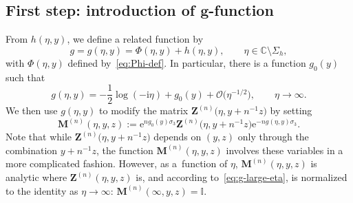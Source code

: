 \documentclass[11pt]{article}
\numberwithin{equation}{section}
\numberwithin{equation}{section}
\begin{document}
\subsection[First step: introduction of g-function]{First step: introduction of $\boldsymbol{g}$-function}
From $h(\eta,y)$, we define a related function by
\begin{equation*}
g=g(\eta,y)=\Phi(\eta,y)+h(\eta,y),\qquad \eta\in\mathbb{C}\setminus\Sigma_h,
\end{equation*}
with $\Phi(\eta,y)$ defined by~\eqref{eq:Phi-def}. In particular,
there is a function $g_0(y)$ such that
\begin{equation}
g(\eta,y)=-\frac{1}{2}\log(-\mathrm{i}\eta) + g_0(y)+\mathcal{O}\bigl(\eta^{-1/2}\bigr),\qquad\eta\to\infty.
\label{eq:g-large-eta}
\end{equation}
We then use $g(\eta,y)$ to modify the matrix $\mathbf{Z}^{(n)}\bigl(\eta,y+n^{-1}z\bigr)$ by setting
\begin{equation}
\mathbf{M}^{(n)}(\eta,y,z):=\mathrm{e}^{ng_0(y)\sigma_3}\mathbf{Z}^{(n)}\bigl(\eta,y+n^{-1}z\bigr)\mathrm{e}^{-ng(\eta,y)\sigma_3}.
\label{eq:MZ}
\end{equation}
Note that while $\mathbf{Z}^{(n)}\bigl(\eta,y+n^{-1}z\bigr)$ depends on $(y,z)$ only through the
combination $y+n^{-1}z$, the function $\mathbf{M}^{(n)}(\eta,y,z)$ involves these
variables in a more complicated fashion. However, as a~function of $\eta$,
$\mathbf{M}^{(n)}(\eta,y,z)$ is analytic where $\mathbf{Z}^{(n)}(\eta,y,z)$ is, and
according to~\eqref{eq:g-large-eta}, is normalized to the identity as
$\eta\to\infty$: $\mathbf{M}^{(n)}(\infty,y,z)=\mathbb{I}$.
\end{document}
